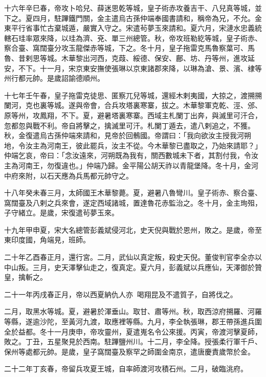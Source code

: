 \begin{pinyinscope}
 十六年辛巳春，帝攻卜哈兒、薛迷思乾等城，皇子術赤攻養吉干、八兒真等城，並下之。夏四月，駐蹕鐵門關，金主遣烏古孫仲端奉國書請和，稱帝為兄，不允。金東平行省事忙古棄城遁，嚴實入守之。宋遣茍夢玉來請和。夏六月，宋漣水忠義統轄石珪率眾來降，以珪為濟、兗、單三州總管。秋，帝攻班勒紇等城，皇子術赤、察合臺、窩闊臺分攻玉龍傑赤等城，下之。冬十月，皇子拖雷克馬魯察葉可、馬魯、昔剌思等城。木華黎出河西，克葭、綏德、保安、鄜、坊、丹等州，進攻延安，不下。十一月，宋京東安撫使張琳以京東諸郡來降，以琳為滄、景、濱、棣等州行都元帥。是歲詔諭德順州。



 十七年壬午春，皇子拖雷克徒思、匿察兀兒等城，還經木剌夷國，大掠之，渡搠搠闌河，克也裏等城。遂與帝會，合兵攻塔裏寒寨，拔之。木華黎軍克乾、涇、邠、原等州，攻鳳翔，不下。夏，避暑塔裏寒寨。西域主札闌丁出奔，與滅里可汗合，忽都忽與戰不利。帝自將擊之，擒滅里可汗。札闌丁遁去，遣八剌追之，不獲。秋，金復遣烏古孫仲端來請和，見帝於回鶻國。帝謂曰：「我向欲汝主授我河朔地，令汝主為河南王，彼此罷兵，汝主不從。今木華黎已盡取之，乃始來請耶？」仲端乞哀，帝曰：「念汝遠來，河朔既為我有，關西數城未下者，其割付我，令汝主為河南王，勿復違也。」仲端乃歸。金平陽公胡天祚以青龍堡降。冬十月，金河中府來附，以石天應為兵馬都元帥守之。



 十八年癸未春三月，太師國王木華黎薨。夏，避暑八魯彎川。皇子術赤、察合臺、窩闊臺及八剌之兵來會，遂定西域諸城，置達魯花赤監治之。冬十月，金主珣殂，子守緒立。是歲，宋復遣茍夢玉來。



 十九年甲申夏，宋大名總管彭義斌侵河北，史天倪與戰於恩州，敗之。是歲，帝至東印度國，角端見，班師。



 二十年乙酉春正月，還行宮。二月，武仙以真定叛，殺史天倪。董俊判官李全亦以中山叛。三月，史天澤擊仙走之，復真定。夏六月，彭義斌以兵應仙，天澤御於贊皇，擒斬之。



 二十一年丙戌春正月，帝以西夏納仇人亦喝翔昆及不遣質子，自將伐之。



 二月，取黑水等城。夏，避暑於渾垂山。取甘、肅等州。秋，取西涼府搠羅、河羅等縣，遂逾沙陀，至黃河九渡，取應裡等縣。九月，李全執張琳，郡王帶孫進兵圍全於益都。冬十一月庚申，帝攻靈州，夏遣嵬名令公來援。丙寅，帝渡河擊夏師，敗之。丁丑，五星聚見於西南。駐蹕鹽州川。十二月，李全降。授張柔行軍千戶、保州等處都元帥。是歲，皇子窩闊臺及察罕之師圍金南京，遣唐慶責歲幣於金。



 二十二年丁亥春，帝留兵攻夏王城，自率師渡河攻積石州。二月，破臨洮府。




\end{pinyinscope}
